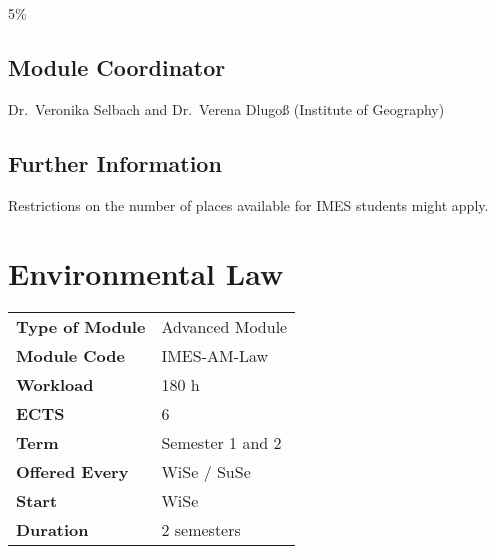 \documentclass[
  letterpaper,
  10pt,
  openany]{book}
\begin{document}

5\%

\section*{Module Coordinator}\label{module-coordinator-1}


Dr.~Veronika Selbach and Dr.~Verena Dlugoß (Institute of Geography)

\section*{Further Information}\label{further-information-1}


Restrictions on the number of places available for IMES students might
apply.

\chapter*{Environmental Law}\label{environmental-law}


\begin{longtable}[]{@{}ll@{}}
\toprule\noalign{}
\endhead
\bottomrule\noalign{}
\endlastfoot
\textbf{Type of Module} & Advanced Module \\
\textbf{Module Code} & IMES-AM-Law \\
\textbf{Workload} & 180 h \\
\textbf{ECTS} & 6 \\
\textbf{Term} & Semester 1 and 2 \\
\textbf{Offered Every} & WiSe / SuSe \\
\textbf{Start} & WiSe \\
\textbf{Duration} & 2 semesters \\
\end{longtable}
\end{document}

